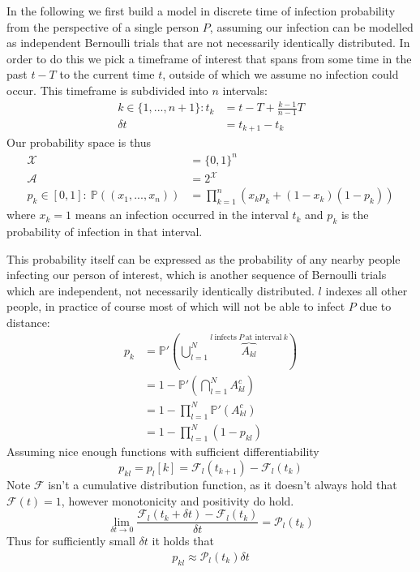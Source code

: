 \documentclass{article}
\begin{document}
In the following we first build a model in discrete time of infection
probability from the perspective of a single person \(P\), assuming our infection
can be modelled as independent Bernoulli trials that are not necessarily
identically distributed. In order to do this we pick a timeframe of interest that
spans from some time in the past \(t-T\) to the current time \(t\),
outside of which we assume no infection could occur. This timeframe is
subdivided into \(n\) intervals:
\begin{align*}
  k \in \{1,...,n+1\}: t_k &= t-T + \frac{k-1}{n-1}T\\
                           \delta t &= t_{k+1} -t_k
\end{align*}
Our probability space is thus
\begin{align*}
  \mathcal{X} &= \{0,1\}^n\\
  \mathcal{A} &= 2^\mathcal{X}\\
  p_k \in [0,1]:\ \mathbb{P}((x_1,...,x_n)) &= \prod_{k=1}^n (x_k p_k + (1-x_k)(1-p_k))
\end{align*}
where \(x_k=1\) means an infection occurred in the interval \(t_k\) and \(p_k\)
is the probability of infection in that interval.
\par
This probability itself can be expressed as the probability of any nearby people
infecting our person of interest, which is another sequence of Bernoulli trials
which are independent, not necessarily identically distributed. \(l\) indexes
all other people, in practice of course most of which will not be able to infect
\(P\) due to distance:
\begin{align*}
  p_k &= \mathbb{P}'\left( \bigcup_{l=1}^N \overbrace{A_{kl}}^{l\ \text{infects}\ P\ \text{at interval}\ k}\right)\\
      &= 1 - \mathbb{P}'\left( \bigcap_{l=1}^N A_{kl}^c\right)\\
      &= 1 - \prod_{l=1}^N {\mathbb{P}'\left( A_{kl}^c \right)}\\
      &= 1 - \prod_{l=1}^N {(1-p_{kl})}
\end{align*}
Assuming nice enough functions with sufficient differentiability
\[
  p_{kl} = p_l[k] = \mathcal{F}_l\left(t_{k+1}\right)- \mathcal{F}_l\left(t_k\right)
\]
Note \(\mathcal{F}\) isn't a cumulative distribution function, as it
doesn't always hold that \(\mathcal{F}(t) = 1\), however monotonicity and
positivity do hold.
\[
  \lim_{\delta t \rightarrow 0} \frac{\mathcal{F}_l\left(t_k + \delta t\right)- \mathcal{F}_l\left(t_k\right)}{\delta t} = \mathcal{P}_l\left(t_k\right)
\]
Thus for sufficiently small \(\delta t\) it holds that
\begin{align*}
  p_{kl} \approx \mathcal{P}_l(t_k)\delta t
\end{align*}
\end{document}
